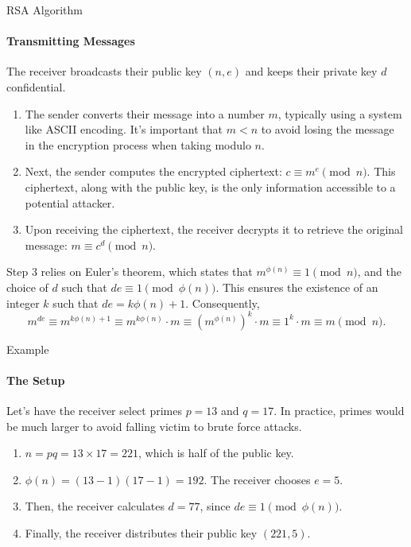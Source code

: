 \documentclass{beamer}
\begin{document}
\begin{frame}{RSA Algorithm}
    \framesubtitle{Transmitting Messages}
    The receiver broadcasts their public key $(n, e)$ and keeps their private key $d$ confidential.
    \begin{enumerate}
        \item The sender converts their message into a number $m$, typically using a system like ASCII encoding. It's important that $m < n$ to avoid losing the message in the encryption process when taking modulo $n$.
        \item Next, the sender computes the encrypted ciphertext: $c \equiv m^e \pmod{n}$. This ciphertext, along with the public key, is the only information accessible to a potential attacker.
        \item Upon receiving the ciphertext, the receiver decrypts it to retrieve the original message: $m \equiv c^{d} \pmod{n}$.
    \end{enumerate}
    Step 3 relies on Euler's theorem, which states that $m^{\phi(n)} \equiv 1 \pmod{n}$, and the choice of $d$ such that $de \equiv 1 \pmod{\phi(n)}$. This ensures the existence of an integer $k$ such that $de = k\phi(n) + 1$. Consequently,
    \[
        m^{de} \equiv m^{k\phi(n) + 1} \equiv m^{k\phi(n)} \cdot m \equiv (m^{\phi(n)})^k \cdot m \equiv 1^k \cdot m \equiv m \pmod{n}.
    \]
\end{frame}

\begin{frame}{Example}
    \framesubtitle{The Setup}
    Let's have the receiver select primes $p = 13$ and $q = 17$. In practice, primes would be much larger to avoid falling victim to brute force attacks.
    \begin{enumerate}
        \item $n = pq = 13 \times 17 = 221$, which is half of the public key.
        \item $\phi(n) = (13 - 1)(17 - 1) = 192$. The receiver chooses $e = 5$.
        \item Then, the receiver calculates $d = 77$, since $de \equiv 1 \pmod{\phi(n)}$.
        \item Finally, the receiver distributes their public key $(221, 5)$.
    \end{enumerate}
\end{frame}
\end{document}
